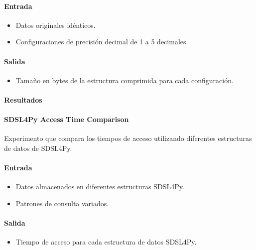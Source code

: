 \paragraph{Entrada}
\begin{itemize}
    \item Datos originales idénticos.
    \item Configuraciones de precisión decimal de 1 a 5 decimales.
\end{itemize}

\paragraph{Salida}
\begin{itemize}
    \item Tamaño en bytes de la estructura comprimida para cada configuración.
\end{itemize}

\paragraph{Resultados}
\vspace{0.5em}
\noindent

\CVDDecimalPlacesSizeComparison

\paragraph{SDSL4Py Access Time Comparison}
\label{sdsl4py_access_time}

Experimento que compara los tiempos de acceso utilizando diferentes estructuras de datos de SDSL4Py.

\paragraph{Entrada}
\begin{itemize}
    \item Datos almacenados en diferentes estructuras SDSL4Py.
    \item Patrones de consulta variados.
\end{itemize}

\paragraph{Salida}
\begin{itemize}
    \item Tiempo de acceso para cada estructura de datos SDSL4Py.
\end{itemize}

